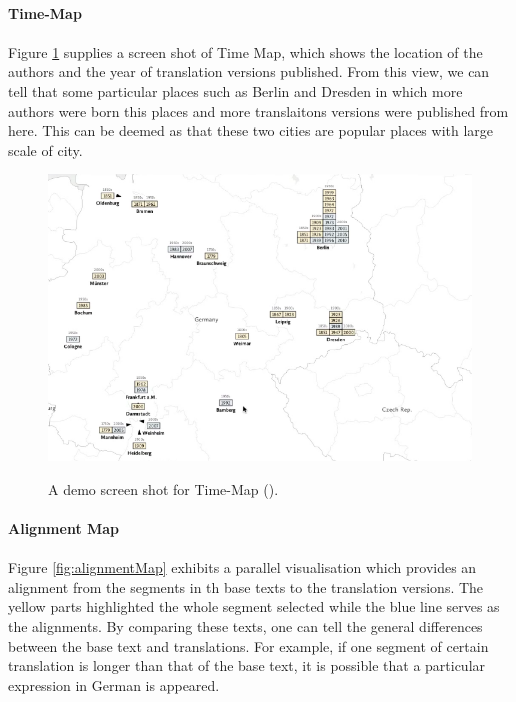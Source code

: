 \paragraph{Time-Map}
\paragraph[]{}

Figure \ref{fig:timeMap} supplies a screen shot of Time Map, which shows the location of the authors and the year of translation versions published. From this view, we can tell that some particular places such as Berlin and Dresden in which more authors were born this places and more translaitons versions were published from here. This can be deemed as that these two cities are popular places with large scale of city.

\begin{figure}[H] 
	\centering    
	\includegraphics[scale=0.7]{Figs/Time-Map}\\[1ex]
	\caption{A demo screen shot for Time-Map (\cite{Cheesman2012}).}
	\label{fig:timeMap}
\end{figure} 

\paragraph{Alignment Map}
\paragraph[]{}

Figure \ref{fig:alignmentMap} exhibits a parallel visualisation which provides an alignment from the segments in th base texts to the translation versions. The yellow parts highlighted the whole segment selected while the blue line serves as the alignments. By comparing these texts, one can tell the general differences between the base text and translations. For example, if one segment of certain translation is longer than that of the base text, it is possible that a particular expression in German is appeared. 

